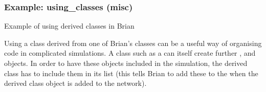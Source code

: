 \documentclass[letterpaper,10pt,english]{manual}
\begin{document}
\resetcurrentobjects
\hypertarget{--doc-examples-misc_using_classes}{}

\hypertarget{index-74}{}\subsubsection{Example: using\_classes (misc)}

Example of using derived classes in Brian

Using a class derived from one of Brian's classes can be a useful way of
organising code in complicated simulations. A class such as a \hyperlink{brian.NeuronGroup}{}
can itself create further \hyperlink{brian.NeuronGroup}{}, \hyperlink{brian.Connection}{} and
\hyperlink{brian.NetworkOperation}{} objects. In order to have these objects included in
the simulation, the derived class has to include them in its 
list (this tells Brian to add these to the \hyperlink{brian.Network}{} when the derived
class object is added to the network).
\end{document}

